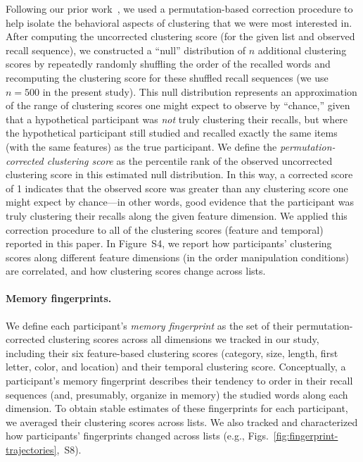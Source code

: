 \documentclass[11pt]{article}
\newcommand{\clusterCorrs}{S4}
\newcommand{\fingerprintTrajectoryRandom}{S8}
\begin{document}
Following our prior work~\citep{HeusEtal17}, we used a permutation-based
correction procedure to help isolate the behavioral aspects of clustering that
we were most interested in. After computing the uncorrected clustering score
(for the given list and observed recall sequence), we constructed a ``null''
distribution of $n$ additional clustering scores by repeatedly randomly
shuffling the order of the recalled words and recomputing the clustering score
for these shuffled recall sequences (we use $n = 500$ in the present study). This null
distribution represents an approximation of the range of clustering scores one
might expect to observe by ``chance,'' given that a hypothetical participant
was \textit{not} truly clustering their recalls, but where the hypothetical
participant still studied and recalled exactly the same items (with the same
features) as the true participant. We define the \textit{permutation-corrected
clustering score} as the percentile rank of the observed uncorrected clustering
score in this estimated null distribution. In this way, a corrected score of 1
indicates that the observed score was greater than any clustering score one
might expect by chance---in other words, good evidence that the participant was
truly clustering their recalls along the given feature dimension. We applied
this correction procedure to all of the clustering scores (feature and
temporal) reported in this paper. In Figure~\clusterCorrs, we report how
participants' clustering scores along different feature dimensions (in the
order manipulation conditions) are correlated, and how clustering scores change
across lists.

\paragraph*{Memory fingerprints.}

We define each participant's \textit{memory fingerprint} as the set of their
permutation-corrected clustering scores across all dimensions we tracked in our
study, including their six feature-based clustering scores (category, size,
length, first letter, color, and location) and their temporal clustering score.
Conceptually, a participant's memory fingerprint describes their tendency to
order in their recall sequences (and, presumably, organize in memory) the
studied words along each dimension. To obtain stable estimates of these
fingerprints for each participant, we averaged their clustering scores across
lists. We also tracked and characterized how participants' fingerprints changed
across lists (e.g.,
Figs.~\ref{fig:fingerprint-trajectories},~\fingerprintTrajectoryRandom).
\end{document}

